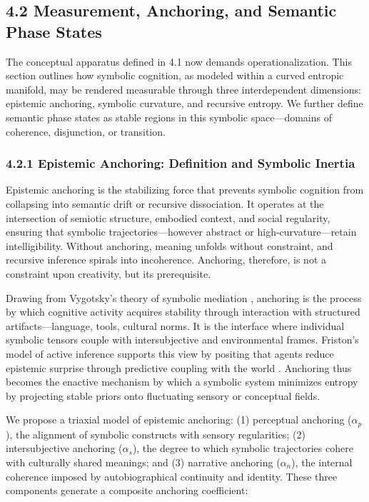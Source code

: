\subsection*{4.2 Measurement, Anchoring, and Semantic Phase States}

The conceptual apparatus defined in 4.1 now demands operationalization. This section outlines how symbolic cognition, as modeled within a curved entropic manifold, may be rendered measurable through three interdependent dimensions: epistemic anchoring, symbolic curvature, and recursive entropy. We further define semantic phase states as stable regions in this symbolic space—domains of coherence, disjunction, or transition.

\subsubsection*{4.2.1 Epistemic Anchoring: Definition and Symbolic Inertia}

Epistemic anchoring is the stabilizing force that prevents symbolic cognition from collapsing into semantic drift or recursive dissociation. It operates at the intersection of semiotic structure, embodied context, and social regularity, ensuring that symbolic trajectories—however abstract or high-curvature—retain intelligibility. Without anchoring, meaning unfolds without constraint, and recursive inference spirals into incoherence. Anchoring, therefore, is not a constraint upon creativity, but its prerequisite.

Drawing from Vygotsky’s theory of symbolic mediation \cite{vygotsky1978mind}, anchoring is the process by which cognitive activity acquires stability through interaction with structured artifacts—language, tools, cultural norms. It is the interface where individual symbolic tensors couple with intersubjective and environmental frames. Friston’s model of active inference supports this view by positing that agents reduce epistemic surprise through predictive coupling with the world \cite{friston2010free}. Anchoring thus becomes the enactive mechanism by which a symbolic system minimizes entropy by projecting stable priors onto fluctuating sensory or conceptual fields.

We propose a triaxial model of epistemic anchoring: (1) perceptual anchoring ($\alpha_p$), the alignment of symbolic constructs with sensory regularities; (2) intersubjective anchoring ($\alpha_s$), the degree to which symbolic trajectories cohere with culturally shared meanings; and (3) narrative anchoring ($\alpha_n$), the internal coherence imposed by autobiographical continuity and identity. These three components generate a composite anchoring coefficient:

